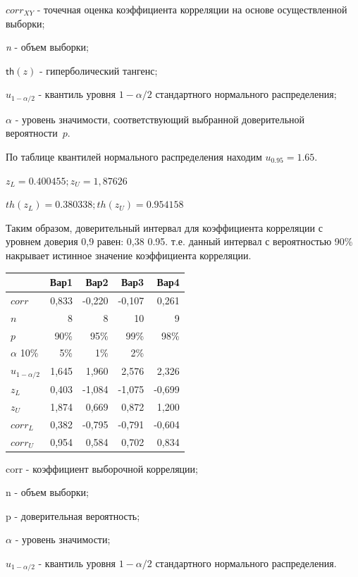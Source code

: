 \documentclass[12pt, table, a4paper,twoside]{exam}
\begin{document}
\begin{questions}
\begin{solution}[6em]
$corr_{XY}$ - точечная оценка коэффициента корреляции на основе осуществленной выборки;

\textit{n} - объем выборки;

$\mathsf{th}(z)$ - гиперболический тангенс;

$u_{1-\alpha/2}$ - квантиль уровня $1-\alpha/2$ стандартного нормального распределения;

$\alpha$ - уровень значимости, соответствующий выбранной доверительной вероятности~$p$.

По таблице квантилей нормального распределения находим $u_{0.95}=1.65$.

$z_L=0.400455; z_U=1,87626$

$th(z_L)=0.380338; th(z_U)=0.954158$

Таким образом, доверительный интервал для коэффициента корреляции с уровнем доверия 0,9 равен: 0,38 0.95. т.е. данный интервал с вероятностью 90\% накрывает истинное значение коэффициента корреляции.

\centering
\begin{tabular}{lrrrr}
	\toprule
	                 &  Вар1 &   Вар2 &   Вар3 &   Вар4 \\ \midrule
	$corr$           & 0,833 & -0,220 & -0,107 &  0,261 \\
	$n$              &     8 &      8 &     10 &      9 \\
	$p$              &  90\% &   95\% &   99\% &   98\% \\ \midrule
	$\alpha$ 10\%    &   5\% &    1\% &    2\% &  \\
	$u_{1-\alpha/2}$ & 1,645 &  1,960 &  2,576 &  2,326 \\
	$z_L$            & 0,403 & -1,084 & -1,075 & -0,699 \\
	$z_U$            & 1,874 &  0,669 &  0,872 &  1,200 \\
	$corr_L$         & 0,382 & -0,795 & -0,791 & -0,604 \\
	$corr_U$         & 0,954 &  0,584 &  0,702 &  0,834 \\ \bottomrule
\end{tabular}%

\raggedright
corr - коэффициент выборочной корреляции;

n - объем выборки;

p - доверительная вероятность;

$\alpha$ -	уровень значимости;

$u_{1-\alpha/2}$ - квантиль уровня $1-\alpha/2$ стандартного нормального распределения.


\end{solution}
\end{questions}
\end{document}
